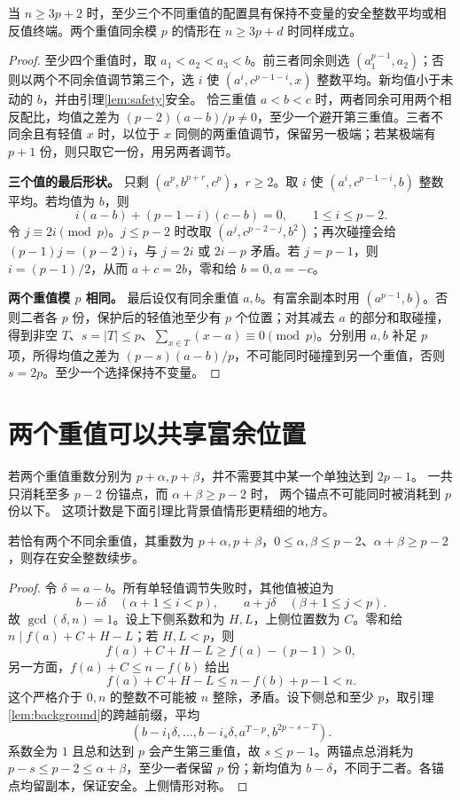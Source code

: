 \begin{lemma}[三个及更多重值的续步]\label{lem:heavy}
当 $n\ge3p+2$ 时，至少三个不同重值的配置具有保持不变量的安全整数平均或相反值终端。两个重值同余模 $p$ 的情形在 $n\ge3p+d$ 时同样成立。
\end{lemma}
\begin{proof}
至少四个重值时，取 $a_1<a_2<a_3<b$。前三者同余则选 $(a_1^{p-1},a_2)$；否则以两个不同余值调节第三个，选 $i$ 使 $(a^i,c^{p-1-i},x)$ 整数平均。新均值小于未动的 $b$，并由引理\ref{lem:safety}安全。
恰三重值 $a<b<c$ 时，两者同余可用两个相反配比，均值之差为 $(p-2)(a-b)/p\ne0$，至少一个避开第三重值。三者不同余且有轻值 $x$ 时，以位于 $x$ 同侧的两重值调节，保留另一极端；若某极端有 $p+1$ 份，则只取它一份，用另两者调节。
\par\noindent\textbf{三个值的最后形状。}
只剩 $(a^p,b^{p+r},c^p)$，$r\ge2$。取 $i$ 使 $(a^i,c^{p-1-i},b)$ 整数平均。若均值为 $b$，则
\[i(a-b)+(p-1-i)(c-b)=0,\qquad1\le i\le p-2.
\]
令 $j\equiv2i\pmod p$。$j\le p-2$ 时改取 $(a^j,c^{p-2-j},b^2)$；再次碰撞会给 $(p-1)j=(p-2)i$，与 $j=2i$ 或 $2i-p$ 矛盾。若 $j=p-1$，则 $i=(p-1)/2$，从而 $a+c=2b$，零和给 $b=0,a=-c$。
\par\noindent\textbf{两个重值模 $p$ 相同。}
最后设仅有同余重值 $a,b$。有富余副本时用 $(a^{p-1},b)$。否则二者各 $p$ 份，保护后的轻值池至少有 $p$ 个位置；对其减去 $a$ 的部分和取碰撞，得到非空 $T$、$s=|T|\le p$、$\sum_{x\in T}(x-a)\equiv0\pmod p$。分别用 $a,b$ 补足 $p$ 项，所得均值之差为 $(p-s)(a-b)/p$，不可能同时碰撞到另一个重值，否则 $s=2p$。至少一个选择保持不变量。
\end{proof}


\section{两个重值可以共享富余位置}
若两个重值重数分别为 $p+\alpha,p+\beta$，并不需要其中某一个单独达到 $2p-1$。
一共只消耗至多 $p-2$ 份锚点，而 $\alpha+\beta\ge p-2$ 时，
两个锚点不可能同时被消耗到 $p$ 份以下。
这项计数是下面引理比背景值情形更精细的地方。

\begin{lemma}[两个重值共享富余副本]\label{lem:two-heavy}
若恰有两个不同余重值，其重数为 $p+\alpha,p+\beta$，$0\le\alpha,\beta\le p-2$、$\alpha+\beta\ge p-2$，则存在安全整数续步。
\end{lemma}
\begin{proof}
令 $\delta=a-b$。所有单轻值调节失败时，其他值被迫为
\[
b-i\delta\quad(\alpha+1\le i<p),\qquad
a+j\delta\quad(\beta+1\le j<p).
\]
故 $\gcd(\delta,n)=1$。设上下侧系数和为 $H,L$，上侧位置数为 $C$。零和给 $n\mid f(a)+C+H-L$；若 $H,L<p$，则
\[
f(a)+C+H-L\ge f(a)-(p-1)>0,
\]
另一方面，$f(a)+C\le n-f(b)$ 给出
\[
f(a)+C+H-L\le n-f(b)+p-1<n.
\]
这个严格介于 $0,n$ 的整数不可能被 $n$ 整除，矛盾。设下侧总和至少 $p$，取引理\ref{lem:background}的跨越前缀，平均
\[(b-i_1\delta,\ldots,b-i_s\delta,a^{T-p},b^{2p-s-T}).
\]
系数全为 $1$ 且总和达到 $p$ 会产生第三重值，故 $s\le p-1$。两锚点总消耗为 $p-s\le p-2\le\alpha+\beta$，至少一者保留 $p$ 份；新均值为 $b-\delta$，不同于二者。各锚点均留副本，保证安全。上侧情形对称。
\end{proof}


